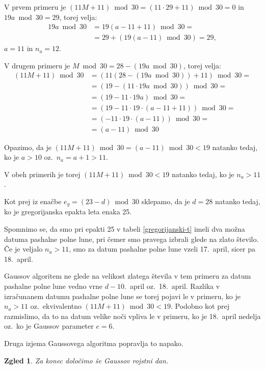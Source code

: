 \documentclass[a4paper,12pt]{article}
\newtheorem{zgled}{Zgled}
\begin{document}
V prvem primeru je $(11M + 11) \bmod 30 = (11 \cdot 29 + 11) \bmod 30 = 0$ in 
$19 a \bmod 30 = 29$, torej velja: 
\begin{align*}
    19 a \bmod 30 &= 19 (a - 11 + 11) \bmod 30 = \\
        &= 29 + (19 (a - 11) \bmod 30) = 29, 
\end{align*}
$a = 11$ in $n_a = 12$.

V drugem primeru je $M \bmod 30 = 28 - (19 a \bmod 30)$, torej velja:
\begin{align*}
    (11 M + 11) \bmod 30 &= (11 (28 - (19 a \bmod 30)) + 11) \bmod 30 = \\
        &= (19 - (11 \cdot 19 a \bmod 30)) \bmod 30 = \\
        &= (19 - 11 \cdot 19 a) \bmod 30 = \\
        &= (19 - 11 \cdot 19 \cdot (a - 11 + 11)) \bmod 30 = \\
        &= (-11 \cdot 19 \cdot (a - 11)) \bmod 30 = \\
        &= (a - 11) \bmod 30
\end{align*}

Opazimo, da je $(11M + 11) \bmod 30 = (a - 11) \bmod 30 < 19$ natanko tedaj, ko je 
$a > 10$ oz.\ $n_a = a + 1 > 11$.

V obeh primerih je torej $(11M + 11) \bmod 30 < 19$ natanko tedaj, ko je $n_a > 11$.

Kot prej iz enačbe $e_g = (23 - d) \bmod 30$ sklepamo, da je $d = 28$ natanko tedaj, 
ko je gregorijanska epakta leta enaka 25.

Spomnimo se, da smo pri epakti 25 v tabeli \ref{gregorijanski-t}
imeli dva možna datuma pashalne polne lune, 
pri čemer smo pravega izbrali glede na zlato število. Če je veljalo $n_a > 11$, smo 
za datum pashalne polne lune vzeli 17.\ april, sicer pa 18.\ april.

Gaussov algoritem ne glede na velikost zlatega števila v tem primeru za datum 
pashalne polne lune vedno vrne $d - 10$.\ april oz.\ 18.\ april. Razlika v 
izračunanem datumu pashalne polne lune se torej pojavi le v primeru, ko je $n_a > 11$
oz.\ ekvivalentno $(11M + 11) \bmod 30 < 19$. Podobno kot prej razmislimo, da to 
na datum velike noči vpliva le v primeru, ko je 18.\ april nedelja oz.\ ko je 
Gaussov parameter $e = 6$. %

Druga izjema Gaussovega algoritma popravlja to napako.


\begin{zgled}
    Za konec določimo še Gaussov rojstni dan. 
\end{zgled} %

\nocite{*}


\end{document}

